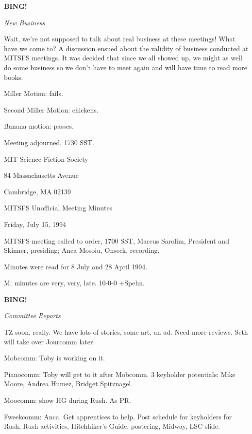 \documentclass[12pt]{article}
\newcommand{\bing}{{\bf BING!} }
\newcommand{\goto}[1]{\bing \vskip 12pt \centerline{{\em{#1}}}}
\begin{document}
\goto{New Business}

Wait, we're not supposed to talk about real business at these meetings! What have we come to? A discussion ensued about the validity of business conducted at MITSFS meetings. It was decided that since we all showed up, we might as well do some business so we don't have to meet again and will have time to read more books.

Miller Motion: fails.

Second Miller Motion: chickens.

Banana motion: passes.

\vspace{12pt}

\noindent
Meeting adjourned, 1730 SST.

\begin{center}

MIT Science Fiction Society 

84 Massachusetts Avenue

Cambridge, MA 02139

\vspace{12pt}

MITSFS Unofficial Meeting Minutes 

Friday, July 15, 1994

\end{center}
 
\vspace{18pt}

\setlength{\parskip}{6pt}

\noindent
MITSFS meeting called to order, 1700 SST,
Marcus Sarofim, President and Skinner, presiding; Anca Mosoiu, Onseck, recording.

Minutes were read for 8 July and 28 April 1994.

M: minutes are very, very, late. 10-0-0 +Spehn.

\goto{Committee Reports}

TZ soon, really. We have lots of stories, some art, an ad. Need more reviews. Seth will take over Jourcomm later.

Mobcomm: Toby is working on it.

Pianocomm: Toby will get to it after Mobcomm. 3 keyholder potentials: Mike Moore, Andrea Humez, Bridget Spitznagel.

Moocomm: show HG during Rush. As PR.

Fweekcomm: Anca. Get apprentices to help. Post schedule for keyholders for Rush, Rush activities, Hitchhiker's Guide, postering, Midway, LSC slide.
\end{document}
